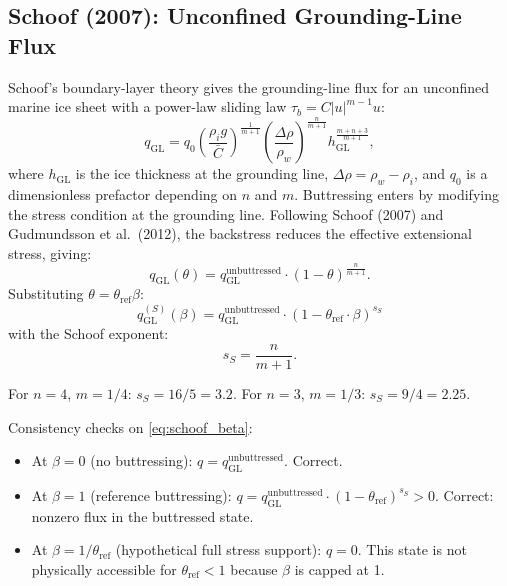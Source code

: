\documentclass[11pt]{article}
\theoremstyle{definition}
\begin{document}
\subsection{Schoof (2007): Unconfined Grounding-Line Flux}
\label{sec:schoof}

Schoof's boundary-layer theory gives the grounding-line flux for an unconfined marine ice sheet with a power-law sliding law $\tau_b = C |u|^{m-1} u$:
\begin{equation}
  q_\text{GL} = q_0 \left(\frac{\rho_i g}{\bar{C}}\right)^{\frac{1}{m+1}}
  \left(\frac{\Delta\rho}{\rho_w}\right)^{\frac{n}{m+1}}
  h_\text{GL}^{\frac{m+n+3}{m+1}},
  \label{eq:schoof_flux}
\end{equation}
where $h_\text{GL}$ is the ice thickness at the grounding line, $\Delta\rho = \rho_w - \rho_i$, and $q_0$ is a dimensionless prefactor depending on $n$ and $m$.  Buttressing enters by modifying the stress condition at the grounding line.  Following Schoof (2007) and Gudmundsson et al.\ (2012), the backstress reduces the effective extensional stress, giving:
\begin{equation}
  q_\text{GL}(\theta) = q_\text{GL}^{\text{unbuttressed}} \cdot (1 - \theta)^{\frac{n}{m+1}}.
  \label{eq:schoof_buttressed}
\end{equation}
Substituting $\theta = \theta_{\text{ref}} \beta$:
\begin{equation}
  \boxed{q_\text{GL}^{(S)}(\beta) = q_\text{GL}^{\text{unbuttressed}} \cdot (1 - \theta_{\text{ref}} \cdot \beta)^{s_S}}
  \label{eq:schoof_beta}
\end{equation}
with the Schoof exponent:
\begin{equation}
  s_S = \frac{n}{m+1}.
  \label{eq:s_schoof}
\end{equation}

For $n = 4$, $m = 1/4$: $s_S = 16/5 = 3.2$.  For $n = 3$, $m = 1/3$: $s_S = 9/4 = 2.25$.

Consistency checks on \cref{eq:schoof_beta}:
\begin{itemize}
  \item At $\beta = 0$ (no buttressing): $q = q_\text{GL}^{\text{unbuttressed}}$.  Correct.
  \item At $\beta = 1$ (reference buttressing): $q = q_\text{GL}^{\text{unbuttressed}} \cdot (1 - \theta_{\text{ref}})^{s_S} > 0$.  Correct: nonzero flux in the buttressed state.
  \item At $\beta = 1/\theta_{\text{ref}}$ (hypothetical full stress support): $q = 0$.  This state is not physically accessible for $\theta_{\text{ref}} < 1$ because $\beta$ is capped at 1.
\end{itemize}
\end{document}

